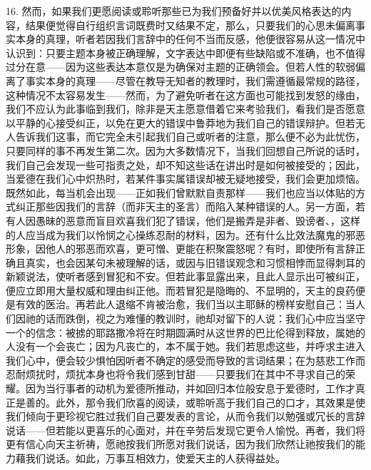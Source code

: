 16. 然而，如果我们更愿阅读或聆听那些已为我们预备好并以优美风格表达的内容，结果便觉得自行组织言词既费时又结果不定，那么，只要我们的心思未偏离事实本身的真理，听者若因我们言辞中的任何不当而反感，他便很容易从这一情况中认识到：只要主题本身被正确理解，文字表达中即便有些缺陷或不准确，也不值得过分在意——因为这些表达本意仅是为确保对主题的正确领会。但若人性的软弱偏离了事实本身的真理——尽管在教导无知者的教理时，我们需遵循最常规的路径，这种情况不太容易发生——然而，为了避免听者在这方面也可能找到发怒的缘由，我们不应认为此事临到我们，除非是天主愿意借着它来考验我们，看我们是否愿意以平静的心接受纠正，以免在更大的错误中鲁莽地为我们自己的错误辩护。但若无人告诉我们这事，而它完全未引起我们自己或听者的注意，那么便不必为此忧伤，只要同样的事不再发生第二次。因为大多数情况下，当我们回想自己所说的话时，我们自己会发现一些可指责之处，却不知这些话在讲出时是如何被接受的；因此，当爱德在我们心中炽热时，若某件事实属错误却被无疑地接受，我们会更加烦恼。既然如此，每当机会出现——正如我们曾默默自责那样——我们也应当以体贴的方式纠正那些因我们的言辞（而非天主的圣言）而陷入某种错误的人。另一方面，若有人因愚昧的恶意而盲目欢喜我们犯了错误，他们是搬弄是非者、毁谤者、，这样的人应当成为我们以怜悯之心操练忍耐的材料，因为。还有什么比效法魔鬼的邪恶形象，因他人的邪恶而欢喜，更可憎、更能在积聚震怒呢？有时，即使所有言辞正确且真实，也会因某句未被理解的话，或因与旧错误观念和习惯相悖而显得刺耳的新颖说法，使听者感到冒犯和不安。但若此事显露出来，且此人显示出可被纠正，便应立即用大量权威和理由纠正他。而若冒犯是隐晦的、不显明的，天主的良药便是有效的医治。再若此人退缩不肯被治愈，我们当以主耶稣的榜样安慰自己：当人们因祂的话而跌倒，视之为难懂的教训时，祂却对留下的人说：我们心中应当坚守一个的信念：被掳的耶路撒冷将在时期圆满时从这世界的巴比伦得到释放，属她的人没有一个会丧亡；因为凡丧亡的，本不属于她。我们若思虑这些，并呼求主进入我们心中，便会较少惧怕因听者不确定的感受而导致的言词结果；在为慈悲工作而忍耐烦扰时，烦扰本身也将令我们感到甘甜——只要我们在其中不寻求自己的荣耀。因为当行事者的动机为爱德所推动，并如回归本位般安息于爱德时，工作才真正是善的。此外，那令我们欣喜的阅读，或聆听高于我们自己的口才，其效果是使我们倾向于更珍视它胜过我们自己要发表的言论，从而令我们以勉强或冗长的言辞说话——但若能以更喜乐的心面对，并在辛劳后发现它更令人愉悦。再者，我们将更有信心向天主祈祷，愿祂按我们所愿对我们说话，因为我们欣然让祂按我们的能力藉我们说话。如此，万事互相效力，使爱天主的人获得益处。\par

